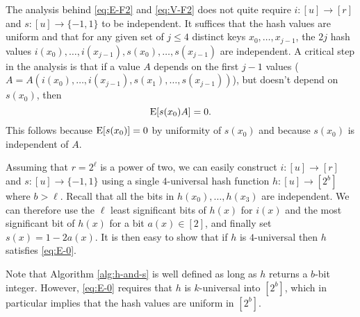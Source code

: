 The analysis behind \eqref{eq:E-F2} and \eqref{eq:V-F2} does not quite
require $i:[u]\to[r]$ and $s:[u]\to\{-1,1\}$ to be independent.
It suffices that the hash values are uniform and that for any
given set of $j\leq 4$ distinct keys $x_0,\ldots,x_{j - 1}$, the $2j$ hash
values $i(x_0),\ldots,i(x_{j - 1}),s(x_0),\ldots,s(x_{j - 1})$ are independent.
A critical step in the analysis is that if
a value $A$ depends on the first $j-1$ values ($A=A(i(x_0),\ldots,i(x_{j - 1}),s(x_1),\ldots,s(x_{j - 1}))$), but doesn't depend
on $s(x_0)$, then
\begin{equation}\label{eq:E-0}
	\operatorname*{E}[s(x_0) A] = 0 .
\end{equation}
This follows because $\operatorname*{E}[s(x_0)]=0$ by uniformity of $s(x_0)$ and because $s(x_0)$ is independent of $A$.


Assuming that $r=2^\ell$ is a power of two, we can easily construct
$i:[u]\to[r]$ and $s:[u]\to\{-1,1\}$ using a single $4$-universal
hash function $h:[u]\to[2^b]$ where $b>\ell$. Recall that all the bits in
$h(x_0),\ldots,h(x_3)$ are independent. We can therefore use the
$\ell$ least significant bits of $h(x)$ for $i(x)$ and the most
significant bit of $h(x)$ for a bit $a(x)\in[2]$, and finally set
$s(x)=1-2a(x)$. It is then easy to show that if $h$ is $4$-universal
then $h$ satisfies \cref{eq:E-0}.
Note that Algorithm \ref{alg:h-and-s} is well defined as long as
$h$ returns a $b$-bit integer. However, \cref{eq:E-0} requires
that $h$ is $k$-universal into $[2^b]$, which in particular implies that
the hash values are uniform in $[2^b]$.


